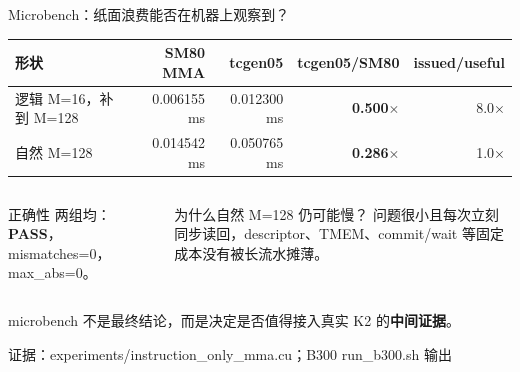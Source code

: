 \documentclass[aspectratio=169,10pt]{beamer}
\newcommand{\good}[1]{\textcolor{KdaGreen}{\textbf{#1}}}
\newcommand{\bad}[1]{\textcolor{KdaRed}{\textbf{#1}}}
\newcommand{\key}[1]{\textcolor{KdaBlue}{\textbf{#1}}}
\newcommand{\source}[1]{\vfill\hfill{\tiny\color{KdaGray}证据：#1}}
\begin{document}
\begin{frame}{Microbench：纸面浪费能否在机器上观察到？}
  \small
  \begin{center}
  \begin{tabular}{lrrrr}
    \toprule
    形状 & SM80 MMA & tcgen05 & tcgen05/SM80 & issued/useful \\
    \midrule
    逻辑 M=16，补到 M=128 & 0.006155 ms & 0.012300 ms & \bad{0.500$\times$} & 8.0$\times$ \\
    自然 M=128 & 0.014542 ms & 0.050765 ms & \bad{0.286$\times$} & 1.0$\times$ \\
    \bottomrule
  \end{tabular}
  \end{center}

  \vspace{0.7em}
  \begin{columns}[T,onlytextwidth]
      \begin{block}{正确性}
        两组均：\good{PASS}，mismatches=0，max\_abs=0。
      \end{block}
      \begin{block}{为什么自然 M=128 仍可能慢？}
        问题很小且每次立刻同步读回，descriptor、TMEM、commit/wait 等固定成本没有被长流水摊薄。
      \end{block}
  \end{columns}

  \centering
  microbench 不是最终结论，而是决定是否值得接入真实 K2 的\key{中间证据}。

  \source{experiments/instruction\_only\_mma.cu；B300 run\_b300.sh 输出}
\end{frame}
\end{document}
